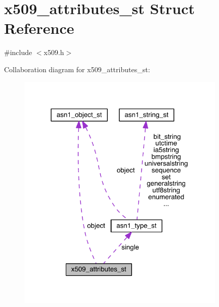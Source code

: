\hypertarget{structx509__attributes__st}{}\section{x509\+\_\+attributes\+\_\+st Struct Reference}
\label{structx509__attributes__st}


{\ttfamily \#include $<$x509.\+h$>$}



Collaboration diagram for x509\+\_\+attributes\+\_\+st\+:\nopagebreak
\begin{figure}[H]
\begin{center}
\leavevmode
\includegraphics[width=283pt]{structx509__attributes__st__coll__graph}
\end{center}
\end{figure}
